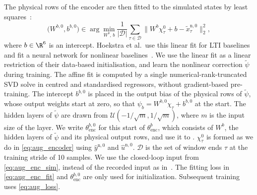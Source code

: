 The physical rows of the encoder are then fitted to the simulated
states by least squares~\cite[Eq.~(33)]{hoekstra2026encoder}:
\begin{equation}
 \bigl(W^{b,0},b^{b,0}\bigr)\in\arg\min_{W^b,\,b}
 \frac{1}{|\mathcal D|}\sum_{\tau\in\mathcal D}
 \bigl\|W^b\chi^{0}_\tau+b-\tilde x^{\mathrm n,0}_\tau\bigr\|_2^2,
 \label{eq:aug_enc_fit}
\end{equation}
where $b\in\R^6$ is an intercept.
Hoekstra et al.\ use this linear fit for LTI baselines and fit a
neural network for nonlinear baselines~\cite[Eqs.~(33), (35)]{hoekstra2026encoder}.
We use the linear fit as a linear restriction of their data-based
initialisation, and learn the nonlinear correction $\tilde\psi$ during
training.
The affine fit is computed by a single numerical-rank-truncated
SVD solve in centred and standardised regressors, without
gradient-based pre-training.
The intercept $b^{b,0}$ is placed in the output bias of the physical rows
of $\tilde\psi$, whose output weights start at zero, so that
$\psi_b=W^{b,0}\chi_\tau+b^{b,0}$ at the start.
The hidden layers of $\tilde\psi$ are drawn from
$\mathcal U(-1/\sqrt m,1/\sqrt m)$, where $m$ is the input size of the layer.
We write $\theta^{b,0}_{\mathrm{enc}}$ for this start of
$\theta^b_{\mathrm{enc}}$, which consists of $W^b$, the hidden layers of
$\tilde\psi$ and its physical output rows, and use it to .
$\chi^0_\tau$ is formed as we do in \eqref{eq:aug_encoder}
using $\hat y^{\mathrm n,0}$ and $\hat u^{\mathrm n,0}$.
$\mathcal D$ is the set of window ends $\tau$ at the training stride of
10 samples.
We use the closed-loop input from \eqref{eq:aug_enc_sim}, instead of the 
recorded input as in~\cite[Eq.~(30)]{hoekstra2026lfr}.
The fitting loss in \eqref{eq:aug_enc_fit} and $\theta^{b,0}_{\mathrm{enc}}$
are only used for initialization.
Subsequent training uses \eqref{eq:aug_loss}.


